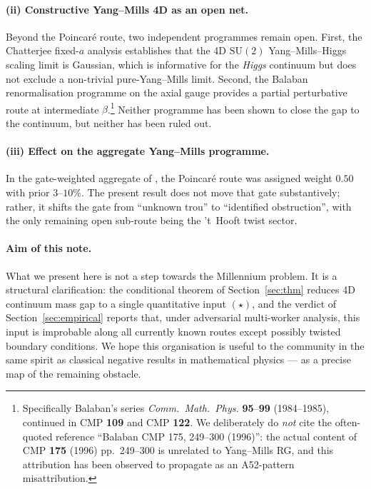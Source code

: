\documentclass[11pt,a4paper]{amsart}
\theoremstyle{definition}
\theoremstyle{remark}
\begin{document}
\paragraph{(ii) Constructive Yang--Mills 4D as an open net.} Beyond the Poincar\'e route, two independent programmes remain open. First, the Chatterjee fixed-$a$ analysis \cite{Chatterjee2024} establishes that the 4D $\mathrm{SU}(2)$ Yang--Mills--Higgs scaling limit is Gaussian, which is informative for the \emph{Higgs} continuum but does not exclude a non-trivial pure-Yang--Mills limit. Second, the Balaban renormalisation programme on the axial gauge provides a partial perturbative route at intermediate $\beta$.\footnote{Specifically Balaban's series \emph{Comm.\ Math.\ Phys.} \textbf{95}--\textbf{99} (1984--1985), continued in CMP \textbf{109} and CMP \textbf{122}. We deliberately do \emph{not} cite the often-quoted reference ``Balaban CMP 175, 249--300 (1996)'': the actual content of CMP \textbf{175} (1996) pp.\ 249--300 is unrelated to Yang--Mills RG, and this attribution has been observed to propagate as an A52-pattern misattribution.} Neither programme has been shown to close the gap to the continuum, but neither has been ruled out.

\paragraph{(iii) Effect on the aggregate Yang--Mills programme.} In the gate-weighted aggregate of \cite{Remondiere2026G4plan}, the Poincar\'e route was assigned weight $0.50$ with prior $3$--$10\%$. The present result does not move that gate substantively; rather, it shifts the gate from ``unknown trou'' to ``identified obstruction'', with the only remaining open sub-route being the 't~Hooft twist sector.

\paragraph{Aim of this note.} What we present here is not a step towards the Millennium problem. It is a structural clarification: the conditional theorem of Section~\ref{sec:thm} reduces 4D continuum mass gap to a single quantitative input $(\star)$, and the verdict of Section~\ref{sec:empirical} reports that, under adversarial multi-worker analysis, this input is improbable along all currently known routes except possibly twisted boundary conditions. We hope this organisation is useful to the community in the same spirit as classical negative results in mathematical physics --- as a precise map of the remaining obstacle.
\end{document}
